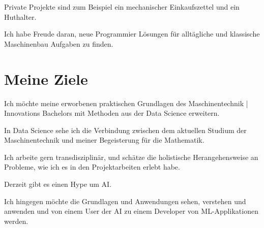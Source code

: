 \documentclass[a4paper,12pt]{article}
\begin{document}
Private Projekte sind zum Beispiel ein mechanischer Einkaufszettel und ein Huthalter. 

Ich habe Freude daran, neue Programmier Lösungen für alltägliche und klassische Maschinenbau Aufgaben zu finden. 

\section{Meine Ziele}

Ich möchte meine erworbenen praktischen Grundlagen des Maschinentechnik | Innovations Bachelors mit Methoden aus der Data Science erweitern.

In Data Science sehe ich die Verbindung zwischen dem aktuellen Studium der Maschinentechnik und meiner Begeisterung für die Mathematik.

Ich arbeite gern transdisziplinär, und schätze die holistische Herangehensweise an Probleme, wie ich es in den Projektarbeiten erlebt habe.

Derzeit gibt es einen Hype um AI.

Ich hingegen möchte die Grundlagen und Anwendungen sehen, verstehen und anwenden und von einem User der AI zu einem Developer von ML-Applikationen werden. 
\end{document}
